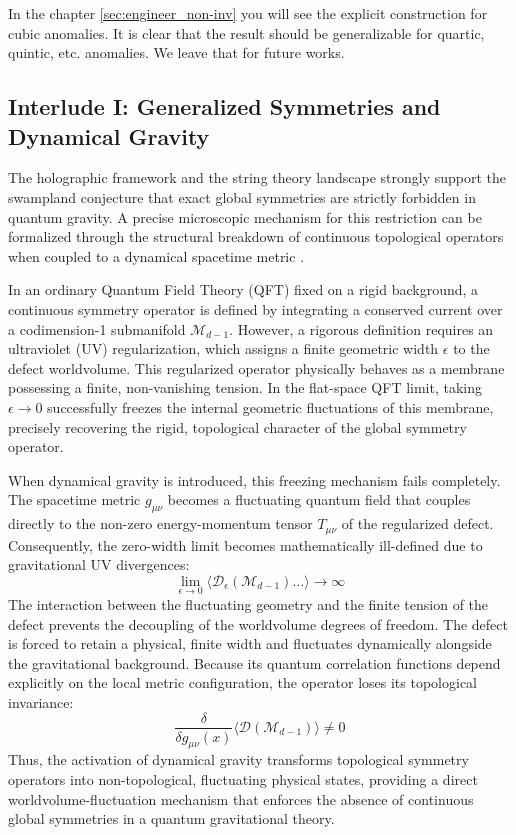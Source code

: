 \documentclass[aps,preprint,nofootinbib,preprintnumbers,eqsecnum,superscriptaddress]{revtex4}
\numberwithin{equation}{section}
\begin{document}
In the chapter \ref{sec:engineer_non-inv} you will see the explicit construction for cubic anomalies. It is clear that the result should be generalizable for quartic, quintic, etc. anomalies. We leave that for future works.

\subsection{Interlude I: Generalized Symmetries and Dynamical Gravity}
\label{sec:gravity_symmetries}

The holographic framework and the string theory landscape strongly support the swampland conjecture that exact global symmetries are strictly forbidden in quantum gravity. A precise microscopic mechanism for this restriction can be formalized through the structural breakdown of continuous topological operators when coupled to a dynamical spacetime metric \cite{Bah_2025}.

In an ordinary Quantum Field Theory (QFT) fixed on a rigid background, a continuous symmetry operator is defined by integrating a conserved current over a codimension-1 submanifold $\mathcal{M}_{d-1}$. However, a rigorous definition requires an ultraviolet (UV) regularization, which assigns a finite geometric width $\epsilon$ to the defect worldvolume. This regularized operator physically behaves as a membrane possessing a finite, non-vanishing tension. In the flat-space QFT limit, taking $\epsilon \to 0$ successfully freezes the internal geometric fluctuations of this membrane, precisely recovering the rigid, topological character of the global symmetry operator.

When dynamical gravity is introduced, this freezing mechanism fails completely. The spacetime metric $g_{\mu\nu}$ becomes a fluctuating quantum field that couples directly to the non-zero energy-momentum tensor $T_{\mu\nu}$ of the regularized defect. Consequently, the zero-width limit becomes mathematically ill-defined due to gravitational UV divergences:
\begin{equation}
    \lim_{\epsilon \to 0} \langle \mathcal{D}_\epsilon(\mathcal{M}_{d-1}) \dots \rangle \longrightarrow \infty
    \label{eq:gravity_divergence}
\end{equation}
The interaction between the fluctuating geometry and the finite tension of the defect prevents the decoupling of the worldvolume degrees of freedom. The defect is forced to retain a physical, finite width and fluctuates dynamically alongside the gravitational background. Because its quantum correlation functions depend explicitly on the local metric configuration, the operator loses its topological invariance:
\begin{equation}
    \frac{\delta}{\delta g_{\mu\nu}(x)} \langle \mathcal{D}(\mathcal{M}_{d-1}) \rangle \neq 0
\end{equation}
Thus, the activation of dynamical gravity transforms topological symmetry operators into non-topological, fluctuating physical states, providing a direct worldvolume-fluctuation mechanism that enforces the absence of continuous global symmetries in a quantum gravitational theory.
\end{document}
